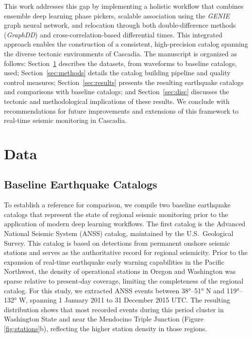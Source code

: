 \documentclass[review]{seismica}
\begin{document}
This work addresses this gap by implementing a holistic workflow that
combines ensemble deep learning phase pickers, scalable association
using the \emph{GENIE} graph neural network, and relocation through both
double-difference methods (\emph{GraphDD}) and cross-correlation-based
differential times. This integrated approach enables the construction of
a consistent, high-precision catalog spanning the diverse tectonic
environments of Cascadia. The manuscript is organized as follows:
Section~\ref{sec:data} describes the datasets, from waveforms to
baseline catalogs, used; Section~\ref{sec:methods} details the catalog
building pipeline and quality control measures;
Section~\ref{sec:results} presents the resulting earthquake catalogs and
comparisons with baseline catalogs; and Section~\ref{sec:disc} discusses
the tectonic and methodological implications of these results. We
conclude with recommendations for future improvements and extensions of
this framework to real-time seismic monitoring in Cascadia.

\section{Data}\label{sec:data}

\subsection{Baseline Earthquake
Catalogs}\label{baseline-earthquake-catalogs}

To establish a reference for comparison, we compile two baseline
earthquake catalogs that represent the state of regional seismic
monitoring prior to the application of modern deep learning workflows.
The first catalog is the Advanced National Seismic System (ANSS)
catalog, maintained by the U.S.~Geological Survey. This catalog is based
on detections from permanent onshore seismic stations and serves as the
authoritative record for regional seismicity. Prior to the expansion of
real-time earthquake early warning capabilities in the Pacific
Northwest, the density of operational stations in Oregon and Washington
was sparse relative to present-day coverage, limiting the completeness
of the regional catalog. For this study, we extracted ANSS events
between 38°--51° N and 119°--132° W, spanning 1 January 2011 to 31
December 2015 UTC. The resulting distribution shows that most recorded
events during this period cluster in Washington State and near the
Mendocino Triple Junction (Figure \ref{fig:stations}b), reflecting the
higher station density in those regions.
\end{document}
